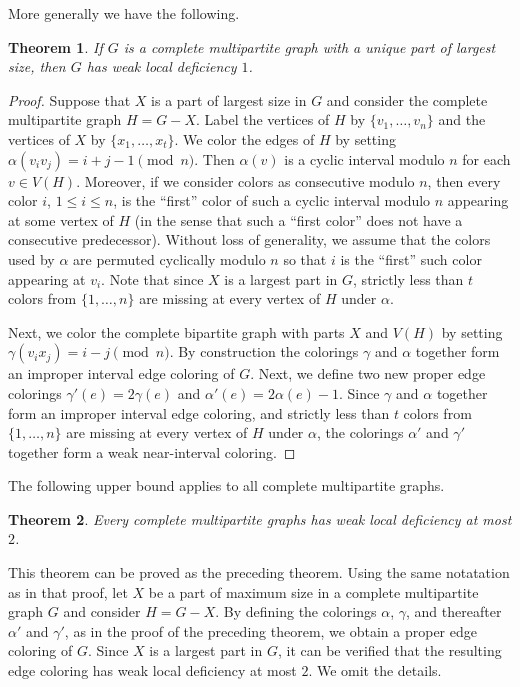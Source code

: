 \documentclass[12pt]{article}
\theoremstyle{plain}
\newtheorem{theorem}{Theorem}[section]
\theoremstyle{definition}
\numberwithin{equation}{section}
\begin{document}
More generally we have the following.

\begin{theorem}
	If $G$ is a complete multipartite graph with a unique part of largest size,
	then $G$ has weak local deficiency $1$.
\end{theorem}
\begin{proof} 
	Suppose that $X$ is a part of largest size in $G$ and consider the complete multipartite graph
	$H=G-X$. Label the vertices of $H$ by $\{v_1,\dots, v_n\}$ and the vertices of $X$ by
	$\{x_1,\dots, x_t\}$.
	We color the edges of $H$ by setting $\alpha(v_i v_j) = i+j-1 \pmod n$. Then $\alpha(v)$
	is a cyclic interval modulo $n$ for each $v \in V(H)$.
	Moreover, if we consider colors as
	consecutive modulo $n$, then every color $i$, $1\leq i \leq n$, is the ``first'' color of such a
	cyclic interval modulo $n$ appearing at some vertex of $H$ (in the sense that such a ``first
	color'' does not have a consecutive predecessor). 
	Without loss of generality, we assume that the colors used by $\alpha$
	are permuted cyclically modulo $n$ so that $i$ is the ``first'' such color appearing at $v_i$. Note that
	since $X$ is a largest part in $G$, strictly less than $t$ colors from
	$\{1,\dots, n\}$ are missing at every vertex of $H$ under $\alpha$.
	
	Next, we color the complete bipartite graph with parts $X$ and $V(H)$ by setting
	$\gamma(v_ix_j) = i-j \pmod n$. 
	By construction the colorings $\gamma$ and $\alpha$ together
	form an improper interval edge coloring of $G$. Next, we define
	two new proper edge colorings $\gamma'(e) = 2\gamma(e)$ and
	$\alpha'(e) = 2\alpha(e)-1$. Since $\gamma$ and $\alpha$ together form an improper interval edge coloring, 
	and strictly less than $t$ colors from
	$\{1,\dots, n\}$ are missing at every vertex of $H$ under $\alpha$,
	the colorings $\alpha'$ and $\gamma'$ together form a weak near-interval coloring.
\end{proof}

The following upper bound applies to all complete multipartite graphs.

\begin{theorem}
	Every complete multipartite graphs has weak local deficiency at most $2$.
\end{theorem}

	This theorem can be proved as the preceding theorem. 
	Using the same notatation as in that proof, let $X$ be a part
	of maximum size in a complete multipartite graph $G$ and 
	consider $H=G-X$. By defining the colorings $\alpha$, $\gamma$,
	and thereafter $\alpha'$ and $\gamma'$,
	as in the proof of the preceding theorem,
	we obtain a proper edge coloring of $G$. Since $X$ is a largest part in $G$,
	it can be verified that the resulting edge coloring has weak local deficiency at most $2$.
	We omit the details.
\end{document}
